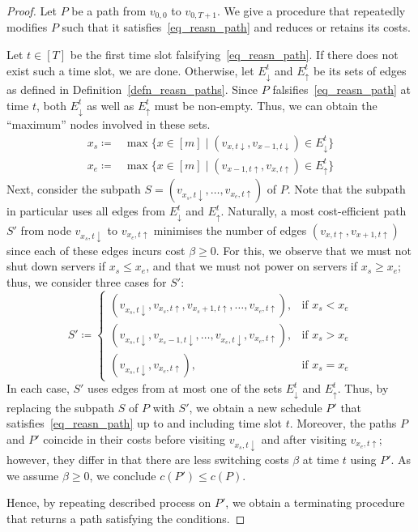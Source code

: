\documentclass[hidelinks]{article}
\theoremstyle{plain}
\theoremstyle{definition}
\theoremstyle{rem}
\newcommand{\costs}{c}
\begin{document}
\begin{proof}
Let $P$ be a path from $v_{0,0}$ to $v_{0,T+1}$. We give a procedure that repeatedly modifies $P$ such that it satisfies~\eqref{eq_reasn_path} and reduces or retains its costs. 

Let $t\in[T]$ be the first time slot falsifying~\eqref{eq_reasn_path}. If there does not exist such a time slot, we are done. Otherwise, let $E_\downarrow^t$ and $E_\uparrow^t$ be its sets of edges as defined in Definition~\ref{defn_reasn_paths}. Since $P$ falsifies~\eqref{eq_reasn_path} at time $t$, both $E_\downarrow^t$ as well as $E_\uparrow^t$ must be non-empty. Thus, we can obtain the ``maximum'' nodes involved in these sets.
\begin{align*}
	x_s\coloneqq&\max\bigl\{x\in[m]\mid (v_{x,t\downarrow},v_{x-1,t\downarrow})\in E_\downarrow^t\bigr\}\\
	x_e\coloneqq&\max\bigl\{x\in[m]\mid (v_{x-1,t\uparrow},v_{x,t\uparrow})\in E_\uparrow^t\bigr\}
\end{align*}
Next, consider the subpath $S=(v_{x_s,t\downarrow},\ldots,v_{x_e,t\uparrow})$ of $P$. Note that the subpath in particular uses all edges from $E_\downarrow^t$ and $E_\uparrow^t$.
Naturally, a most cost-efficient path $S'$ from node $v_{x_s,t\downarrow}$ to $v_{x_e,t\uparrow}$ minimises the number of edges $(v_{x,t\uparrow},v_{x+1,t\uparrow})$ since each of these edges incurs cost $\beta\ge 0$. For this, we observe that we must not shut down servers if $x_s\le x_e$, and that we must not power on servers if $x_s\ge x_e$; thus, we consider three cases for $S'$:
\begin{equation*}
	S'\coloneqq
	\begin{cases}
		(v_{x_s,t\downarrow},v_{x_s,t\uparrow},v_{x_s+1,t\uparrow},\ldots,v_{x_e,t\uparrow}), & \text{if $x_s< x_e$}\\
		(v_{x_s,t\downarrow},v_{x_s-1,t\downarrow},\ldots,v_{x_e,t\downarrow},v_{x_e,t\uparrow}), & \text{if $x_s>x_e$}\\
		(v_{x_s,t\downarrow},v_{x_e,t\uparrow}), & \text{if $x_s=x_e$}
	\end{cases}
\end{equation*}
In each case, $S'$ uses edges from at most one of the sets $E_\downarrow^t$ and $E_\uparrow^t$. Thus, by replacing the subpath $S$ of $P$ with $S'$, we obtain a new schedule $P'$ that satisfies~\eqref{eq_reasn_path} up to and including time slot $t$. Moreover, the paths $P$ and $P'$ coincide in their costs before visiting $v_{x_s,t\downarrow}$ and after visiting $v_{x_e,t\uparrow}$; however, they differ in that there are less switching costs $\beta$ at time $t$ using $P'$. As we assume $\beta\ge0$, we conclude $\costs(P')\le \costs(P)$.

Hence, by repeating described process on $P'$, we obtain a terminating procedure that returns a path satisfying the conditions.
\end{proof}
\end{document}
